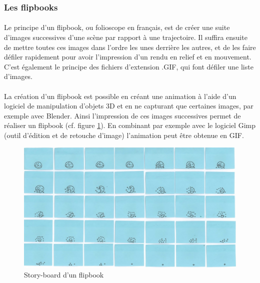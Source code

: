 \subsubsection{Les flipbooks}

\paragraph{}
	Le principe d’un flipbook, ou folioscope en français, est de créer une suite d’images successives d’une scène par rapport à une trajectoire. Il suffira ensuite de mettre toutes ces images dans l’ordre les unes derrière les autres, et de les faire défiler rapidement pour avoir l’impression d’un rendu en relief et en mouvement. C’est également le principe des fichiers d’extension .GIF, qui font défiler une liste d’images.

\paragraph{}
	La création d’un flipbook est possible en créant une animation à l’aide d’un logiciel de manipulation d’objets 3D et en ne capturant que certaines images, par exemple avec Blender. Ainsi l’impression de ces images successives permet de réaliser un flipbook (cf. figure \ref{fig:flipbook}). En combinant par exemple avec le logiciel Gimp (outil d’édition et de retouche d’image) l’animation peut être obtenue en GIF. 

\begin{figure}[h!]
		\centering
		\includegraphics[scale=0.7]{flipbook.png}
		\caption{\label{fig:flipbook} Story-board d’un flipbook \protect \footnotemark }
\end{figure}

